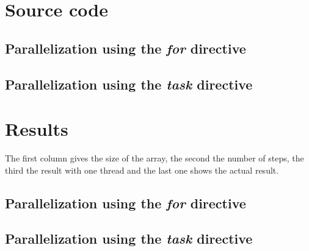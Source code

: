 \chapter{Source code}

\section{Parallelization using the \textit{for} directive}
\label{for}


\section{Parallelization using the \textit{task} directive}
\label{task}


\chapter{Results}

The first column gives the size of the array, the second the number of steps, the third the result with one thread and the last one shows the actual result.

\section{Parallelization using the \textit{for} directive}



\section{Parallelization using the \textit{task} directive}


